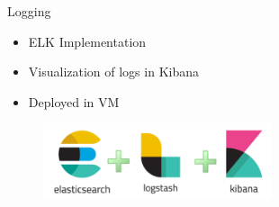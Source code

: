 \begin{frame}{Logging}
	\begin{itemize}
	\item ELK Implementation
        \item Visualization of logs in  Kibana
        \item Deployed in VM
	\end{itemize}
	\begin{figure}[htbp]
  		\centering
  		\includegraphics[width=0.6\textwidth]{figures/elk}
	\end{figure}
\end{frame}